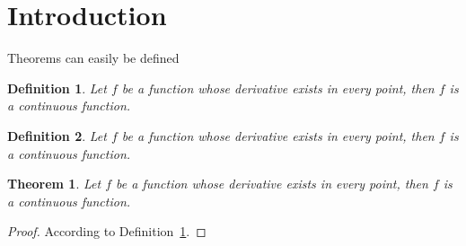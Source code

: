 \documentclass{article}
\newtheorem{theorem}{Theorem}
\newtheorem{definition}{Definition}
\begin{document}
\section{Introduction}
Theorems can easily be defined

\begin{definition}
	\label{def:label1}
	Let $f$ be a function whose derivative exists in every point, then $f$ is a continuous function.
\end{definition}
 
\begin{definition}
	\label{def:label2}
	Let $f$ be a function whose derivative exists in every point, then $f$ is a continuous function.
\end{definition}

\begin{theorem}
	\label{th:1}
	Let $f$ be a function whose derivative exists in every point, then $f$ is a continuous function.
\end{theorem}
\begin{proof}
	According to Definition~\ref{def:label1}.
\end{proof}
\end{document}
